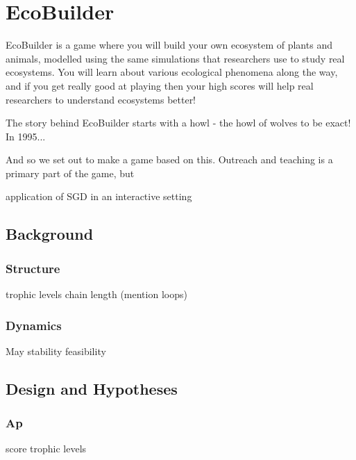 \chapter{EcoBuilder}
EcoBuilder is a game where you will build your own ecosystem of plants and animals, modelled using the same simulations that researchers use to study real ecosystems. You will learn about various ecological phenomena along the way, and if you get really good at playing then your high scores will help real researchers to understand ecosystems better!

The story behind EcoBuilder starts with a howl - the howl of wolves to be exact! In 1995...

And so we set out to make a game based on this. Outreach and teaching is a primary part of the game, but 


application of SGD in an interactive setting

\section{Background}

\subsection{Structure}
trophic levels
chain length
(mention loops)
\subsection{Dynamics}
May stability
feasibility

\section{Design and Hypotheses}
\subsection{Ap}
score
trophic levels

